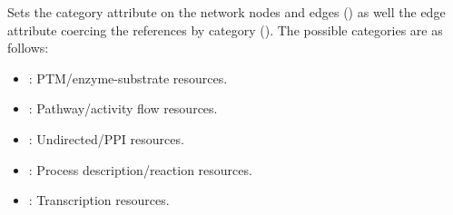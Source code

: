 \documentclass[letterpaper,10pt,english]{sphinxmanual}
\begin{document}
\begin{fulllineitems}
\begin{fulllineitems}
\begin{quote}
\begin{description}
\end{description}\end{quote}

\end{fulllineitems}


\begin{fulllineitems}
\label{\detokenize{reference:pypath.main.PyPath.sequences}}
\end{fulllineitems}


\begin{fulllineitems}
\label{\detokenize{reference:pypath.main.PyPath.set_boolean_vattr}}
\end{fulllineitems}


\begin{fulllineitems}
\label{\detokenize{reference:pypath.main.PyPath.set_categories}}
Sets the category attribute on the network nodes and edges
() as well the edge attribute coercing the references
by category (). The possible categories are
as follows:
\begin{itemize}
\item {} 
: PTM/enzyme-substrate resources.

\item {} 
: Pathway/activity flow resources.

\item {} 
: Undirected/PPI resources.

\item {} 
: Process description/reaction resources.

\item {} 
: Transcription resources.


\end{itemize}
\end{fulllineitems}
\end{fulllineitems}
\end{document}
